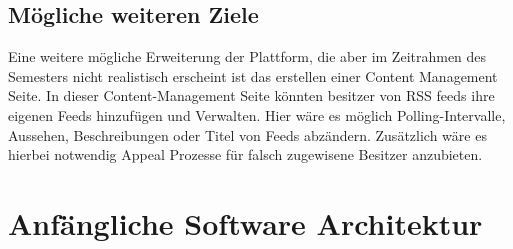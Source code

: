 \subsection{Mögliche weiteren Ziele}
Eine weitere mögliche Erweiterung der Plattform, die aber im Zeitrahmen des Semesters nicht realistisch erscheint ist das erstellen einer Content Management Seite.
In dieser Content-Management Seite könnten besitzer von RSS feeds ihre eigenen Feeds hinzufügen und Verwalten.
Hier wäre es möglich Polling-Intervalle, Aussehen, Beschreibungen oder Titel von Feeds abzändern.
Zusätzlich wäre es hierbei notwendig Appeal Prozesse für falsch zugewisene Besitzer anzubieten.

\section{Anfängliche Software Architektur}
